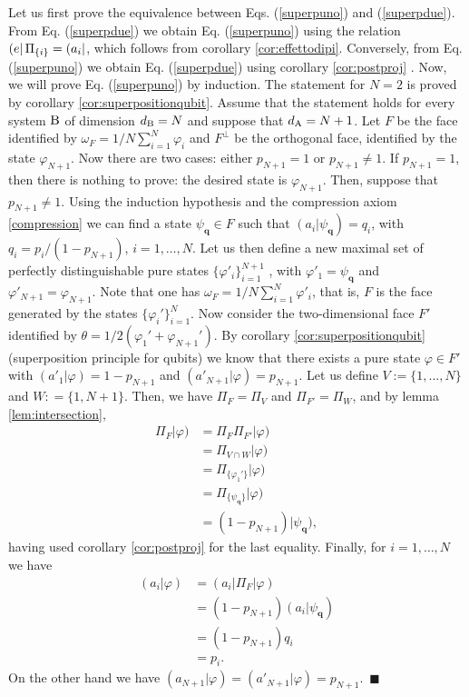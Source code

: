 \documentclass[12pt,aps,pra,showpacs,groupedaddress]{revtex4-1}
\def\Proof{\medskip\par\noindent{\bf Proof. }}
\def\qed{$\,\blacksquare$\par}
\def\rB{{\rm B}}
\def\SC#1#2{\left(#1\right|\left.\!#2\right)}  \def\Tr{{\rm Tr}}
\begin{document}
\Proof Let us first prove the equivalence between Eqs. (\ref{superpuno}) and (\ref{superpdue}).    From Eq. (\ref{superpdue}) we obtain Eq. (\ref{superpuno}) using the relation $\left(e\right| \Pi_{\{i\}} = \left(a_i\right|$, which follows from corollary \ref{cor:effettodipi}.  Conversely, from Eq. (\ref{superpuno}) we obtain Eq. (\ref{superpdue})  using corollary  \ref{cor:postproj} . Now, we will prove Eq. (\ref{superpuno})
by induction. The statement for $N=2$ is proved by corollary \ref{cor:superpositionqubit}.  Assume
that the statement holds for every system $\rB$ of dimension $d_\rB=N$ and suppose that $d_{\rm A}=N+1$.
Let $F$ be the face identified by $\omega_F = 1/N \sum_{i=1}^N \varphi_i$ and $F^\perp$ be the
orthogonal face, identified by the state $\varphi_{N+1}$.  Now there are two cases:  either $p_{N+1}  =1$  or $p_{N+1}  \not = 1$.  If $p_{N+1}=1$, then there is nothing to prove:  the desired state is $\varphi_{N+1}$.   Then, suppose that $p_{N+1}  \not = 1$.  Using the induction hypothesis and the
compression axiom \ref{compression} we can find a state $\psi_{\mathbf q} \in F$ such that $\SC
{a_i} {\psi_{\mathbf q}} = q_i$, with $q_i=p_i/(1-p_{N+1})$, $i=1, \dots, N$.  Let us then define a
new maximal set of perfectly distinguishable pure states $\{\varphi'_i\}_{i=1}^{N+1}$ 
, with $\varphi'_1=\psi_{\mathbf q}$ and $\varphi'_{N+1}=\varphi_{N+1}$.  Note that one has $\omega_F = 1/N \sum_{i=1}^N \varphi'_i$, that is, $F$ is the face generated by the states $\{\varphi_i'\}_{i=1}^N$.    Now
consider the two-dimensional face $F'$ identified by $\theta = 1/2 (\varphi_1' + \varphi_{N+1}')$. By corollary
\ref{cor:superpositionqubit} (superposition principle for qubits) we know that there exists a pure state
$\varphi \in F'$ with $(a'_1|\varphi)=1-p_{N+1}$ and $(a'_{N+1}|\varphi)=p_{N+1}$. 
Let us define $V :=\{1, \dots, N\}$ and $W: = \{ 1, N+1\}$. Then,  we have $\Pi_F = \Pi_V$  and $\Pi_{F'} = \Pi_W$, and  by lemma
\ref{lem:intersection},
\begin{align*}
\Pi_F |\varphi) &=\Pi_F\Pi_{F'} |\varphi)\\
&=\Pi_{V\cap W}|\varphi)\\
  & =\Pi_{ \{\varphi_1'\} } |\varphi)\\
  & =\Pi_{\{\psi_{\mathbf q}\}}|\varphi)\\
  &=(1-p_{N+1})|\psi_{\mathbf q}),
  \end{align*} 
having used corollary \ref{cor:postproj}  for the last equality. 
Finally, for $i=1,\dots,N$ we have
\begin{align*}
(a_i|\varphi)&=(a_i|\Pi_F|\varphi)\\
&=(1-p_{N+1}) \SC {a_i}  {\psi_{\mathbf q}}\\
&= (1-p_{N+1}) q_i\\
 &=p_i.
 \end{align*}
 On the other hand we have $(a_{N+1}|\varphi)=(a'_{N+1}|\varphi)=p_{N+1}$.
 \qed
\end{document}
